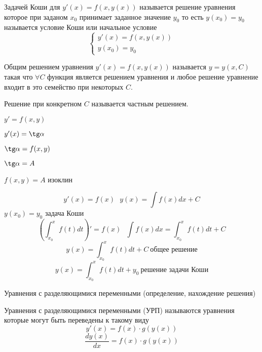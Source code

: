 \begin{define}
  Задачей Коши для $y'(x) = f(x, y(x))$ называется
  решение уравнения которое при заданом $x_0$ принимает
  заданное значение $y_0$ то есть $y(x_0) = y_0$
  называется условие Коши или начальное условие
  $$
  \left\{
  \begin{array}{l}
    y'(x) = f(x, y(x)) \\
    y(x_0) = y_0
  \end{array}
  \right.
  $$
\end{define}

\begin{define}
  Общим решением уравнения $y'(x) = f(x, y(x))$ называется $y = y(x,C)$
  такая что $\forall C$ функция является решением уравнения и любое
  решение уравнение входит в это семейство при некоторых $C$.

  Решение при конкретном $C$ называется частным решением.
\end{define}

\begin{define}[изоклина]
  $y' = f(x,y)$

  $y'(x) = \tg \alpha$

  $\tg \alpha = f(x,y)$

  $\tg \alpha = A$

  $f(x, y) = A$ изоклин
\end{define}

\begin{block}
  $$
  y'(x) = f(x) ~~~ y(x) = \int f(x)dx + C
  $$
  $y(x_0) = y_0$ задача Коши
  $$
  \left( \int_{x_0}^x f(t) dt \right)' = f(x) ~~~ \int f(x)dx = \int_{x_0}^x
  f(t)dt + C
  $$
  $$
  y(x) = \int_{x_0}^x f(t)dt + C ~ \text{общее решение}
  $$
  $$
  y(x) = \int_{x_0}^x f(t)dt + y_0 ~ \text{решение задачи Коши}
  $$
\end{block}

\begin{title}[\Large]
  Уравнения с разделяющимися переменными (определение, нахождение решения)
\end{title}

\begin{define}
  Уравнения с разделяющимися переменными (УРП) называются уравнения которые
  могут быть переведены к такому виду
  $$
  y'(x) = f(x) \cdot g(y(x))
  $$
  $$
  \frac{dy(x)}{dx} = f(x) \cdot g(y(x))
  $$
\end{define}

